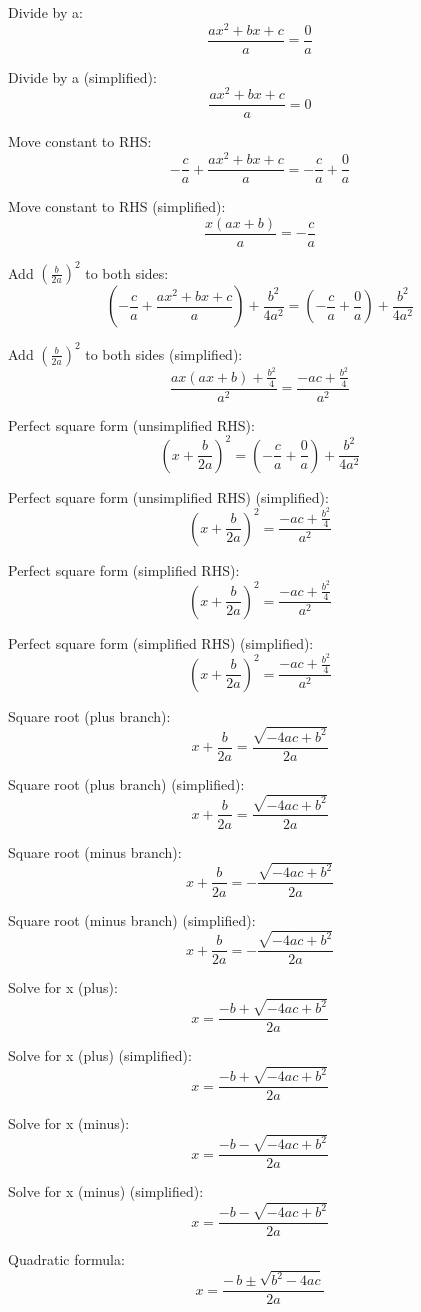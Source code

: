 \documentclass[a4paper]{article}
\theoremstyle{plain} %
\theoremstyle{definition} %
\numberwithin{equation}{subsection}
\begin{document}
Divide by a: $$ \frac{a x^{2} + b x + c}{a} = \frac{0}{a} $$

Divide by a (simplified): $$ \frac{a x^{2} + b x + c}{a} = 0 $$

Move constant to RHS: $$ - \frac{c}{a} + \frac{a x^{2} + b x + c}{a} = - \frac{c}{a} + \frac{0}{a} $$

Move constant to RHS (simplified): $$ \frac{x \left(a x + b\right)}{a} = - \frac{c}{a} $$

Add $(\frac{b}{2a})^2$ to both sides: $$ \left(- \frac{c}{a} + \frac{a x^{2} + b x + c}{a}\right) + \frac{b^{2}}{4 a^{2}} = \left(- \frac{c}{a} + \frac{0}{a}\right) + \frac{b^{2}}{4 a^{2}} $$

Add $(\frac{b}{2a})^2$ to both sides (simplified): $$ \frac{a x \left(a x + b\right) + \frac{b^{2}}{4}}{a^{2}} = \frac{- a c + \frac{b^{2}}{4}}{a^{2}} $$

Perfect square form (unsimplified RHS): $$ \left(x + \frac{b}{2 a}\right)^{2} = \left(- \frac{c}{a} + \frac{0}{a}\right) + \frac{b^{2}}{4 a^{2}} $$

Perfect square form (unsimplified RHS) (simplified): $$ \left(x + \frac{b}{2 a}\right)^{2} = \frac{- a c + \frac{b^{2}}{4}}{a^{2}} $$

Perfect square form (simplified RHS): $$ \left(x + \frac{b}{2 a}\right)^{2} = \frac{- a c + \frac{b^{2}}{4}}{a^{2}} $$

Perfect square form (simplified RHS) (simplified): $$ \left(x + \frac{b}{2 a}\right)^{2} = \frac{- a c + \frac{b^{2}}{4}}{a^{2}} $$

Square root (plus branch): $$ x + \frac{b}{2 a} = \frac{\sqrt{- 4 a c + b^{2}}}{2 a} $$

Square root (plus branch) (simplified): $$ x + \frac{b}{2 a} = \frac{\sqrt{- 4 a c + b^{2}}}{2 a} $$

Square root (minus branch): $$ x + \frac{b}{2 a} = - \frac{\sqrt{- 4 a c + b^{2}}}{2 a} $$

Square root (minus branch) (simplified): $$ x + \frac{b}{2 a} = - \frac{\sqrt{- 4 a c + b^{2}}}{2 a} $$

Solve for x (plus): $$ x = \frac{- b + \sqrt{- 4 a c + b^{2}}}{2 a} $$

Solve for x (plus) (simplified): $$ x = \frac{- b + \sqrt{- 4 a c + b^{2}}}{2 a} $$

Solve for x (minus): $$ x = \frac{- b - \sqrt{- 4 a c + b^{2}}}{2 a} $$

Solve for x (minus) (simplified): $$ x = \frac{- b - \sqrt{- 4 a c + b^{2}}}{2 a} $$

Quadratic formula: $$ x = \frac{-\,b \pm \sqrt{b^{2}-4ac}}{2a} $$
\end{document}
